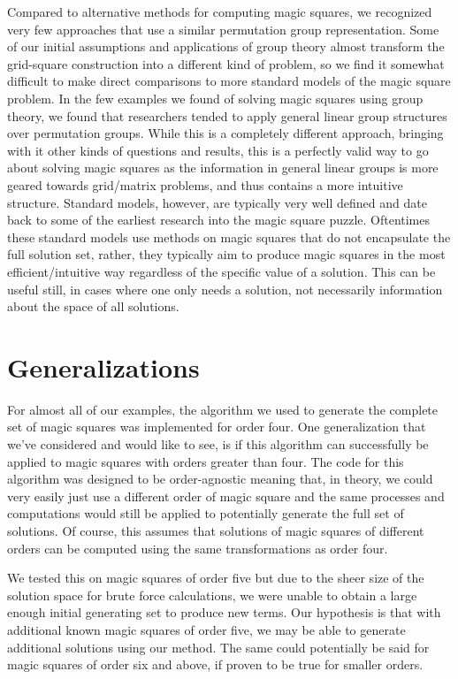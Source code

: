 \documentclass[12pt]{report}
\begin{document}
\par Compared to alternative methods for computing magic squares, we recognized very few approaches
that use a similar permutation group representation. Some of our initial assumptions and
applications of group theory almost transform the grid-square construction into a different kind of
problem, so we find it somewhat difficult to make direct comparisons to more standard models of the
magic square problem. In the few examples we found of solving magic squares using group theory, we
found that researchers tended to apply general linear group structures over permutation groups.
While this is a completely different approach, bringing with it other kinds of questions and
results, this is a perfectly valid way to go about solving magic squares as the information in
general linear groups is more geared towards grid/matrix problems, and thus contains a more
intuitive structure. Standard models, however, are typically very well defined and date back to
some of the earliest research into the magic square puzzle. Oftentimes these standard models use
methods on magic squares that do not encapsulate the full solution set, rather, they typically aim
to produce magic squares in the most efficient/intuitive way regardless of the specific value of a
solution. This can be useful still, in cases where one only needs a solution, not necessarily
information about the space of all solutions.

\section{Generalizations}

\par For almost all of our examples, the algorithm we used to generate the complete set of magic
squares was implemented for order four. One generalization that we've considered and would like to
see, is if this algorithm can successfully be applied to magic squares with orders greater than
four. The code for this algorithm was designed to be order-agnostic meaning that, in theory, we
could very easily just use a different order of magic square and the same processes and
computations would still be applied to potentially generate the full set of solutions. Of course,
this assumes that solutions of magic squares of different orders can be computed using the same
transformations as order four.

\par We tested this on magic squares of order five but due to the sheer size of the solution space
for brute force calculations, we were unable to obtain a large enough initial generating set to
produce new terms. Our hypothesis is that with additional known magic squares of order five, we may
be able to generate additional solutions using our method. The same could potentially be said for
magic squares of order six and above, if proven to be true for smaller orders.
\end{document}
